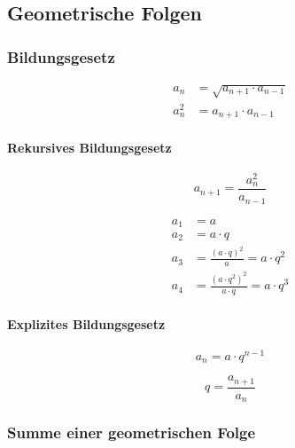 \subsection{Geometrische Folgen}

\subsubsection{Bildungsgesetz}

\begin{align*}
	a_n   & = \sqrt{a_{n+1} \cdot a_{n-1}} \\
	a_n^2 & = a_{n+1} \cdot a_{n-1}
\end{align*}

\begin{gesetz}
	\paragraph{Rekursives Bildungsgesetz}
	\[
		a_{n+1} = \frac{a_n^2}{a_{n-1}}
	\]
\end{gesetz}

\begin{align*}
	a_1 & = a                                                 \\
	a_2 & = a \cdot q                                         \\
	a_3 & = \frac{{(a \cdot q)}^2}{a} = a \cdot q^2           \\
	a_4 & = \frac{{(a \cdot q^2)}^2}{a \cdot q} = a \cdot q^3
\end{align*}

\begin{gesetz}
	\paragraph{Explizites Bildungsgesetz}
	\[
		a_n = a \cdot q^{n-1}
	\]
\end{gesetz}

\[
	q = \frac{a_{n+1}}{a_n}
\]

\subsubsection{Summe einer geometrischen Folge}

